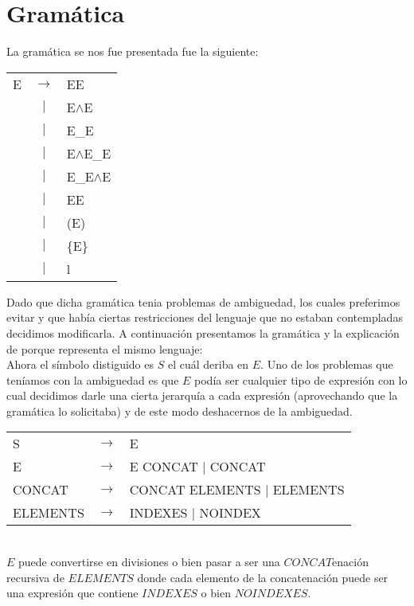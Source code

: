\section{Gramática}
La gramática se nos fue presentada fue la siguiente:\\

\begin{tabular}{ l c l }
    E & $\rightarrow$ & EE \\
    & $|$ & E$\wedge$E \\
    & $|$ & E\_E \\
    & $|$ & E$\wedge$E\_E \\
    & $|$ & E\_E$\wedge$E \\
    & $|$ & E\/E \\
    & $|$ & (E) \\
    & $|$ & \{E\} \\
    & $|$ & l \\
\end{tabular}

Dado que dicha gramática tenia problemas de ambiguedad, los cuales preferimos evitar y que había ciertas restricciones del lenguaje que no estaban contempladas decidimos modificarla.
A continuación presentamos la gramática y la explicación de porque representa el mismo lenguaje: \\

Ahora el símbolo distiguido es $S$ el cuál deriba en $E$. Uno de los problemas que teníamos con la ambiguedad es que $E$ podía
ser cualquier tipo de expresión con lo cual decidimos darle una cierta jerarquía a cada expresión (aprovechando que la gramática lo solicitaba) y de este modo
deshacernos de la ambiguedad.\\


\begin{tabular}{ l c l }
    S &        $\rightarrow$ & E \\
    E &        $\rightarrow$ & E \/ CONCAT $|$ CONCAT \\
    CONCAT &   $\rightarrow$ & CONCAT ELEMENTS $|$ ELEMENTS \\
    ELEMENTS & $\rightarrow$ & INDEXES $|$ NOINDEX \\
\end{tabular} \\
$E$ puede convertirse en divisiones o bien pasar a ser una $CONCAT$enación recursiva de $ELEMENTS$ donde cada elemento de la concatenación
puede ser una expresión que contiene $INDEXES$ o bien $NOINDEXES$.\\

